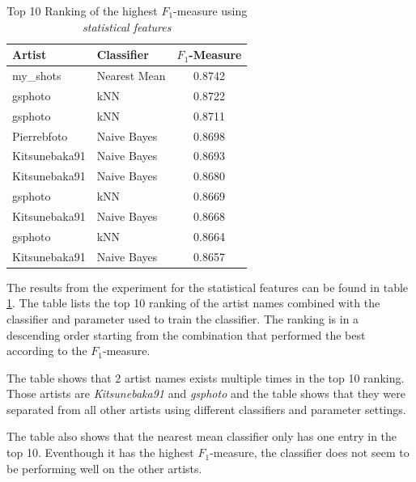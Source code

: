 \begin{table}[htb]
    \centering
    \begin{tabular}
        { | l | l | c |} 
        \hline
        Artist & Classifier & $F_1$-Measure \\
        \hline
        my\_shots & Nearest Mean & 0.8742 \\ 
        gsphoto & kNN & 0.8722 \\ 
        gsphoto & kNN & 0.8711 \\ 
        Pierrebfoto & Naive Bayes & 0.8698 \\ 
        Kitsunebaka91 & Naive Bayes & 0.8693 \\
        Kitsunebaka91 & Naive Bayes & 0.8680 \\
        gsphoto & kNN & 0.8669 \\
        Kitsunebaka91 & Naive Bayes & 0.8668 \\
        gsphoto & kNN & 0.8664 \\
        Kitsunebaka91 & Naive Bayes & 0.8657 \\
        \hline 
    \end{tabular}
    \caption{Top 10 Ranking of the highest $F_1$-measure using \textit{statistical features}}
    \label{ex1aresults}
\end{table}

The results from the experiment for the statistical features can be found in table \ref{ex1aresults}.
The table lists the top 10 ranking of the artist names combined with the classifier and parameter used to train the classifier.
The ranking is in a descending order starting from the combination that performed the best according to the $F_1$-measure.

The table shows that 2 artist names exists multiple times in the top 10 ranking.
Those artists are \textit{Kitsunebaka91} and \textit{gsphoto} and the table shows that they were separated from all other artists using different classifiers and parameter settings.

The table also shows that the nearest mean classifier only has one entry in the top 10.
Eventhough it has the highest $F_1$-measure, the classifier does not seem to be performing well on the other artists.

